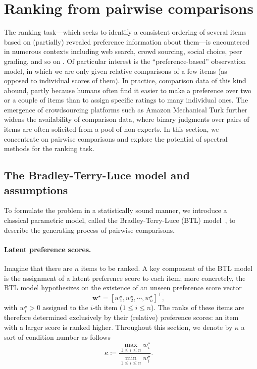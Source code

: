 

\section{Ranking from pairwise comparisons}
\label{sec:ranking}




The ranking task---which seeks to identify a consistent ordering of several items based on
(partially) revealed preference information about them---is encountered in numerous contexts
including web search, crowd sourcing, social choice, peer grading, and so on \citep{dwork2001rank,chen2013pairwise,caplin1991aggregation,shah2013case}.
Of particular interest is the ``preference-based'' observation model,
in which we are only given relative comparisons of a few items (as opposed to individual scores of them).
In practice, comparison data of this kind abound,
partly because humans often find it easier to make a preference over two or a couple of items than to assign specific ratings to many individual ones.
The emergence of crowdsourcing platforms such as Amazon Mechanical Turk further widens the availability of comparison data,
where binary judgments over pairs of items are often solicited from a pool of non-experts.
In this section, we concentrate on pairwise comparisons and
explore the potential of spectral methods for the ranking task.




\subsection{The Bradley-Terry-Luce model and assumptions \label{subsec:Problem-setup-and-ranking}}

To formulate the problem in a statistically sound manner, we introduce a classical parametric model,
called the Bradley-Terry-Luce (BTL) model~\citep{bradley1952rank,ford1957solution,luce2012individual},
to describe the generating process of pairwise comparisons.


\paragraph{Latent preference scores.}
Imagine that there are $n$ items to be ranked.
A key component of the BTL model is the assignment of a latent preference score to each item; more concretely, the BTL model hypothesizes on the existence of an unseen preference score vector
%
\begin{equation}
	\bm{w}^{\star}=[w_{1}^{\star},w_{2}^{\star},\cdots, w_{n}^{\star}]^{\top},
	\label{eq:ranking-score}
\end{equation}
%
with $w_{i}^{\star}>0$ assigned to the $i$-th item ($1\leq i\leq n$).
The ranks of these items are therefore determined exclusively by their (relative) preference scores: an item with a larger score is ranked higher.
Throughout this section, we denote by $\kappa$ a sort of  condition number as follows
%
\begin{equation}
	\kappa \coloneqq\frac{\max_{1\leq i\leq n}w_{i}^{\star}}{\min_{1\leq i\leq n}w_{i}^{\star}}.
	\label{eq:ranking-well-condition}
\end{equation}

